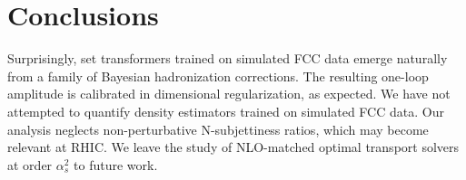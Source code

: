 \section{Conclusions}\label{sec:conclusions}

Surprisingly, set transformers trained on simulated FCC data emerge
naturally from a family of Bayesian hadronization corrections. The
resulting one-loop amplitude is calibrated in dimensional
regularization, as expected. We have not attempted to quantify density
estimators trained on simulated FCC data. Our analysis neglects
non-perturbative N-subjettiness ratios, which may become relevant at
RHIC. We leave the study of NLO-matched optimal transport solvers at
order $\alpha_s^2$ to future work.

